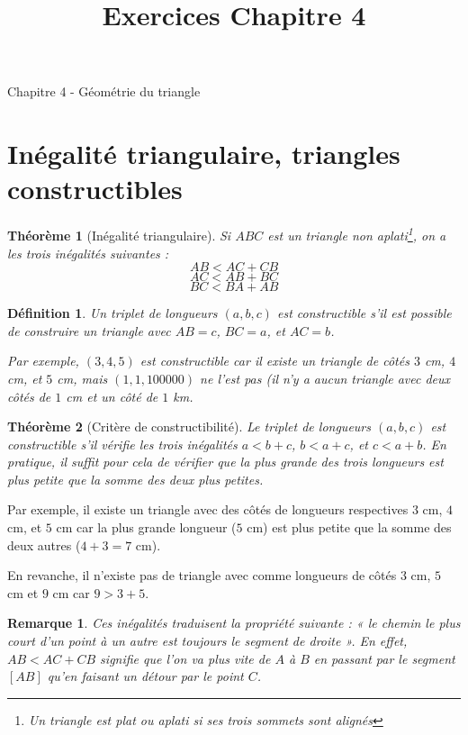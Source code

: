 \documentclass[12 pt]{article}
\title{Exercices Chapitre 4}
\date{}
\theoremstyle{plain}
\newcounter{n}
\numberwithin{n}{section}
\newtheorem{theo}{Théorème}
\newtheorem{df}[n]{Définition}
\newtheorem{rmq}[n]{Remarque}
\begin{document}
\begin{center}{\Large Chapitre 4 - Géométrie du triangle}\\ 
 \end{center}

\section{Inégalité triangulaire, triangles constructibles}

\begin{theo}[Inégalité triangulaire]
Si $ABC$ est un triangle non aplati\footnote{Un triangle est \emph{plat} ou \emph{aplati} si ses trois sommets sont alignés}, 
on a les trois inégalités suivantes : \[AB < AC + CB \] \[AC < AB + BC \] \[BC < BA + AB \]
\end{theo}

\begin{df}
Un triplet de longueurs $(a,b,c)$ est \emph{constructible} s'il est possible de construire un triangle avec $AB= c$, 
$BC=a$, et $AC=b$. 

Par exemple, $(3,4,5)$ est constructible car il existe un triangle de côtés $3$ cm, $4$ cm, et $5$ cm, mais $(1,1, 100000)$ ne l'est pas (il n'y a aucun triangle avec deux côtés de $1$ cm et un côté de $1$ km. 
\end{df}

\begin{theo}[Critère de constructibilité]
Le triplet de longueurs $(a,b,c)$ est constructible s'il vérifie les trois inégalités $a < b+c$, $b < a+c$, et $c<a+b$. 
En pratique, il suffit pour cela de vérifier que la plus grande des trois longueurs est plus petite que la somme des deux plus petites. 
\end{theo}
Par exemple, il existe un triangle avec des côtés de longueurs respectives $3$ cm, $4$ cm, et $5$ cm car la plus grande longueur ($5$ cm) est plus petite que la somme des deux autres ($4+3=7$ cm).

En revanche, il n'existe pas de triangle avec comme longueurs de côtés $3$ cm, $5$ cm et $9$ cm car $9 > 3+5$. 

\begin{rmq}
Ces inégalités traduisent la propriété suivante : « \emph{le chemin le plus court d'un point à un autre est toujours
le segment de droite} ». En effet, $AB <AC+CB$ signifie que l'on va plus vite de $A$ à $B$ en passant par le segment 
$[AB]$ qu'en faisant un détour par le point $C$. 
\end{rmq} 
\end{document}
